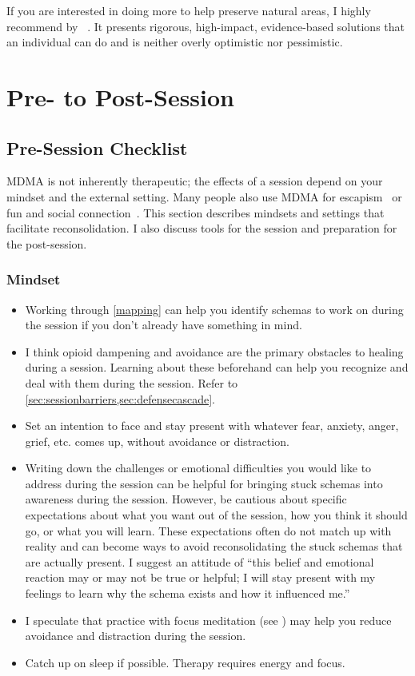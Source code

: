 \documentclass[11pt,oneside]{book}
\let\cite\parencite
\newcommand{\prosecite}[1]{\citetitle{#1} by \citefullauthor{#1}~\cite{#1}}
\begin{document}
If you are interested in doing more to help preserve natural areas, I highly recommend \prosecite{ritchie2024not}. It presents rigorous, high-impact, evidence-based solutions that an individual can do and is neither overly optimistic nor pessimistic.

\chapter{Pre- to Post-Session}
\section{Pre-Session Checklist}
\label{prep}
MDMA is not inherently therapeutic; the effects of a session depend on your mindset and the external setting. Many people also use MDMA for escapism~\cite{moonzweEscapism} or fun and social connection~\cite{huntPleasure}. This section describes mindsets and settings that facilitate reconsolidation. I also discuss tools for the session and preparation for the post-session.

\subsection*{Mindset}
\begin{itemize}
    \item Working through \cref{mapping} can help you identify schemas to work on during the session if you don't already have something in mind.
    \item I think opioid dampening and avoidance are the primary obstacles to healing during a session. Learning about these beforehand can help you recognize and deal with them during the session. Refer to \cref{sec:sessionbarriers,sec:defensecascade}.
    \item Set an intention to face and stay present with whatever fear, anxiety, anger, grief, etc. comes up, without avoidance or distraction.
    \item Writing down the challenges or emotional difficulties you would like to address during the session can be helpful for bringing stuck schemas into awareness during the session. However, be cautious about specific expectations about what you want out of the session, how you think it should go, or what you will learn. These expectations often do not match up with reality and can become ways to avoid reconsolidating the stuck schemas that are actually present. I suggest an attitude of \enquote{this belief and emotional reaction may or may not be true or helpful; I will stay present with my feelings to learn why the schema exists and how it influenced me.}
    \item I speculate that practice with focus meditation (see \textcite{rain}) may help you reduce avoidance and distraction during the session.
    \item Catch up on sleep if possible. Therapy requires energy and focus.
\end{itemize}
\end{document}
